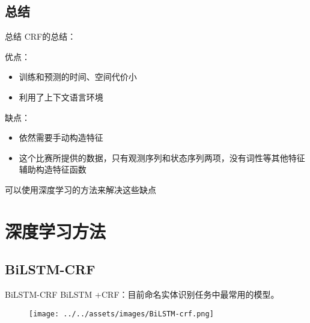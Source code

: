 \documentclass[9pt,aspectratio=169]{ctexbeamer}
\begin{document}
	\subsection{总结}
	\begin{frame}{总结}
		CRF的总结：
		
		优点：
		
		\begin{itemize}
			\item 训练和预测的时间、空间代价小
			\item 利用了上下文语言环境
		\end{itemize}
	
		缺点：
		
		\begin{itemize}
			\item 依然需要手动构造特征
			\item 这个比赛所提供的数据，只有观测序列和状态序列两项，没有词性等其他特征辅助构造特征函数
		\end{itemize}
	
		可以使用深度学习的方法来解决这些缺点
	\end{frame}
	
	\section{深度学习方法}
	\subsection{BiLSTM-CRF}
	\begin{frame}{BiLSTM-CRF}
		BiLSTM +CRF：目前命名实体识别任务中最常用的模型。
		
		\begin{figure}
			\centering
			\texttt{[image: ../../assets/images/BiLSTM-crf.png]}
		\end{figure}
		

		
	\end{frame}
	
\end{document}

